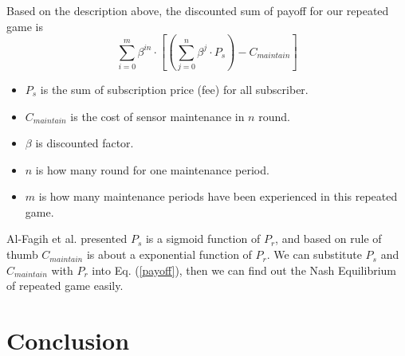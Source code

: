 \documentclass[journal,a4paper]{IEEEtran}
\begin{document}
Based on the description above, the discounted sum of payoff for our repeated game is 
\begin{equation} \label{payoff}
\sum_{i=0}^{m}{\beta^{in}\cdot [(\sum_{j=0}^{n} \beta^j \cdot P_s) - C_{maintain}]}
\end{equation}

\begin{itemize}
\item $P_s$ is the sum of subscription price (fee) for all subscriber.
\item $C_{maintain}$ is the cost of sensor maintenance in $n$ round.
\item $\beta$ is discounted factor.
\item $n$ is how many round for one maintenance period.
\item $m$ is how many maintenance periods have been experienced in this repeated game.
\end{itemize}

Al-Fagih et al. presented\cite{DataPrice} $P_s$ is a sigmoid function of $P_r$, and based on rule of thumb $C_{maintain}$ is about a exponential function of $P_r$. We can substitute $P_s$ and $C_{maintain}$ with $P_r$ into Eq. (\ref{payoff}), then we can find out the Nash Equilibrium of repeated game easily.

\section{Conclusion}



  







\end{document}
